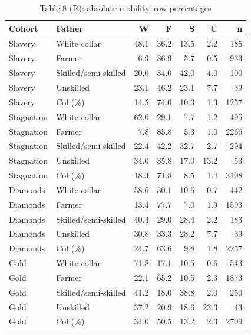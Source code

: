 \begin{table}

\caption{Table 8 (R): absolute mobility, row percentages}
\centering
\begin{tabular}[t]{llrrrrr}
\toprule
Cohort & Father & W & F & S & U & n\\
\midrule
Slavery & White collar & 48.1 & 36.2 & 13.5 & 2.2 & 185\\
Slavery & Farmer & 6.9 & 86.9 & 5.7 & 0.5 & 933\\
Slavery & Skilled/semi-skilled & 20.0 & 34.0 & 42.0 & 4.0 & 100\\
Slavery & Unskilled & 23.1 & 46.2 & 23.1 & 7.7 & 39\\
Slavery & Col (\%) & 14.5 & 74.0 & 10.3 & 1.3 & 1257\\
\addlinespace
Stagnation & White collar & 62.0 & 29.1 & 7.7 & 1.2 & 495\\
Stagnation & Farmer & 7.8 & 85.8 & 5.3 & 1.0 & 2266\\
Stagnation & Skilled/semi-skilled & 22.4 & 42.2 & 32.7 & 2.7 & 294\\
Stagnation & Unskilled & 34.0 & 35.8 & 17.0 & 13.2 & 53\\
Stagnation & Col (\%) & 18.3 & 71.8 & 8.5 & 1.4 & 3108\\
\addlinespace
Diamonds & White collar & 58.6 & 30.1 & 10.6 & 0.7 & 442\\
Diamonds & Farmer & 13.4 & 77.7 & 7.0 & 1.9 & 1593\\
Diamonds & Skilled/semi-skilled & 40.4 & 29.0 & 28.4 & 2.2 & 183\\
Diamonds & Unskilled & 30.8 & 33.3 & 28.2 & 7.7 & 39\\
Diamonds & Col (\%) & 24.7 & 63.6 & 9.8 & 1.8 & 2257\\
\addlinespace
Gold & White collar & 71.8 & 17.1 & 10.5 & 0.6 & 543\\
Gold & Farmer & 22.1 & 65.2 & 10.5 & 2.3 & 1873\\
Gold & Skilled/semi-skilled & 41.2 & 18.0 & 38.8 & 2.0 & 250\\
Gold & Unskilled & 37.2 & 20.9 & 18.6 & 23.3 & 43\\
Gold & Col (\%) & 34.0 & 50.5 & 13.2 & 2.3 & 2709\\
\bottomrule
\end{tabular}
\end{table}
